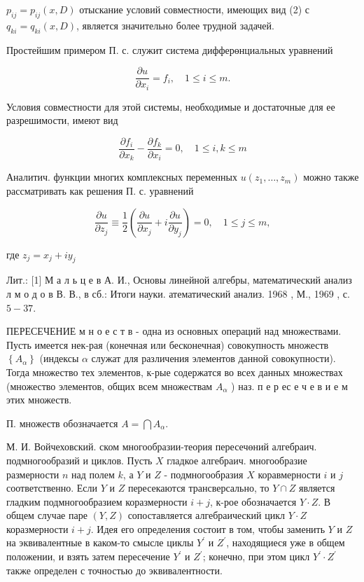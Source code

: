\documentclass[10pt]{article}
\begin{document}
$p_{i j}=p_{i j}(x, D)$ отыскание условий совместности, имеющих вид (2) с $q_{k i}=q_{k i}(x, D)$, является значительно более трудной задачей.

Простейшим примером П. с. служит система дифферөнциальных уравнений

\[
\frac{\partial u}{\partial x_{i}}=f_{i}, \quad 1 \leqslant i \leqslant m .
\]

Условия совместности для этой системы, необходимые и достаточные для ее разрешимости, имеют вид

\[
\frac{\partial f_{i}}{\partial x_{k}}-\frac{\partial f_{k}}{\partial x_{i}}=0, \quad 1 \leqslant i, k \leqslant m
\]

Аналитич. функции многих комплексных переменных $u\left(z_{1}, \ldots, z_{m}\right)$ можно также рассматривать как решения П. с. уравнений

\[
\frac{\partial u}{\partial z_{j}} \equiv \frac{1}{2}\left(\frac{\partial u}{\partial x_{j}}+i \frac{\partial u}{\partial y_{j}}\right)=0, \quad 1 \leqslant j \leqslant m,
\]

где $z_{j}=x_{j}+i y_{j}$

Лит.: [1] М а л ь ц е в А. И., Основы линейной алгебры, математический анализ л м о д о в В. В., в сб.: Итоги науки. атематический анализ. 1968 , М., 1969 , с. $5-37$.

ПЕРЕСЕЧЕНИЕ м н о е с т в - одна из основных операций над множествами. Пусть имеется нек-рая (конечная или бесконечная) совокупность множеств $\left\{A_{\alpha}\right\}$ (индексы $\alpha$ служат для различения элементов данной совокупности). Тогда множество тех элементов, к-рые содержатся во всех данных множествах (множество элементов, общих всем множествам $A_{\alpha}$ ) наз. п е р ес е ч е в и е м этих множеств.

П. множеств обозначается $A=\bigcap A_{\alpha}$.

М. И. Войчеховский. ском многообразии-теория пересечөний алгебраич. подмногообразий и циклов. Пусть $X$ гладкое алгебраич. многообразие размерности $n$ над полем $k$, а $Y$ и $Z$ - подмногообразия $X$ коравмерности $i$ и $j$ соответственно. Если $Y$ и $Z$ пересекаются трансверсально, то $Y \cap Z$ является гладким подмногообразием коразмерности $i+j$, к-рое обозначается $Y \cdot Z$. В общем случае паре $(Y, Z)$ сопоставляется алгебраический цикл $Y \cdot Z$ коразмерности $i+j$. Идея его определения состоит в том, чтобы заменить $Y$ и $Z$ на эквивалентные в каком-то смысле циклы $Y^{\prime}$ и $Z^{\prime}$, находящиеся уже в общем положении, и взять затем пересечение $Y^{\prime}$ и $Z^{\prime}$; конечно, при этом цикл $Y^{\prime} \cdot Z^{\prime}$ также определен с точностью до эквивалентности.
\end{document}
